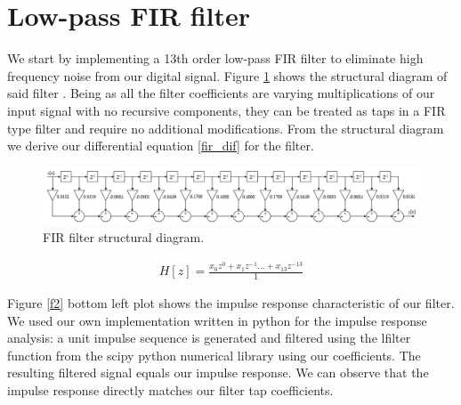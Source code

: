 \documentclass[10pt,a4paper,twocolumn]{article}
\begin{document}
\section*{Low-pass FIR filter}
We start by implementing a 13th order low-pass FIR filter to eliminate high frequency noise from our digital signal. Figure \ref{f1} shows the structural diagram of said filter \cite{lab2_ref}. Being as all the filter coefficients are varying multiplications of our input signal with no recursive components, they can be treated as taps in a FIR type filter and require no additional modifications. From the structural diagram we derive our differential equation \ref{fir_dif} for the filter. 


\begin{figure} %
	[!h]
	\centering
	\includegraphics*[width=.8\columnwidth]{fir_struct.png} %
	\caption{FIR filter structural diagram.}
	\label{f1}
	\vspace{3pt}
\end{figure}


\begin{eqnarray}
H[z] = \frac{x_0z^{0} + x_1z^{-1} ... + x_{13}z^{-13}}{1}
\label{fir_dif}
\end{eqnarray}


Figure \ref{f2} bottom left plot shows the impulse response characteristic of our filter. We used our own implementation written in python for the impulse response analysis: a unit impulse sequence is generated and filtered using the lfilter function from the scipy python numerical library using our coefficients. The resulting filtered signal equals our impulse response. We can observe that the impulse response directly matches our filter tap coefficients.
\end{document}
